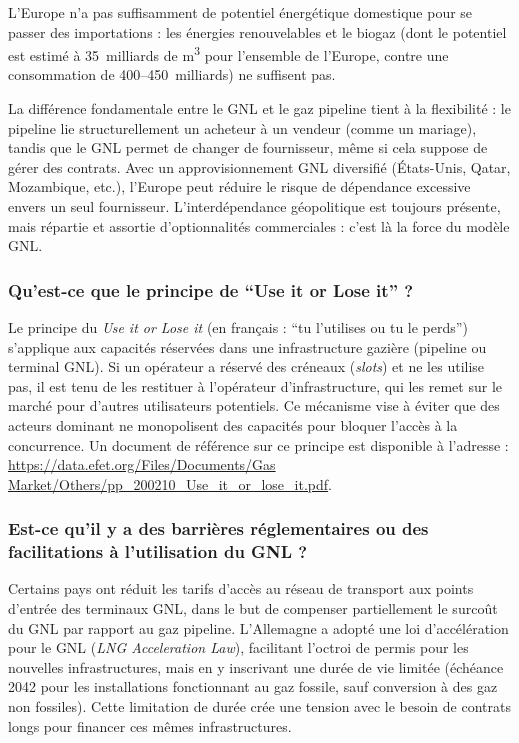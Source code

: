 L'Europe n'a pas suffisamment de potentiel énergétique domestique pour se passer des importations : les énergies renouvelables et le biogaz (dont le potentiel est estimé à 35~milliards de m\textsuperscript{3} pour l'ensemble de l'Europe, contre une consommation de 400--450~milliards) ne suffisent pas.

La différence fondamentale entre le GNL et le gaz pipeline tient à la flexibilité : le pipeline lie structurellement un acheteur à un vendeur (comme un mariage), tandis que le GNL permet de changer de fournisseur, même si cela suppose de gérer des contrats. Avec un approvisionnement GNL diversifié (États-Unis, Qatar, Mozambique, etc.), l'Europe peut réduire le risque de dépendance excessive envers un seul fournisseur. L'interdépendance géopolitique est toujours présente, mais répartie et assortie d'optionnalités commerciales : c'est là la force du modèle GNL.

\subsubsection{Qu'est-ce que le principe de \enquote{Use it or Lose it} ?}

Le principe du \textit{Use it or Lose it} (en français : \enquote{tu l'utilises ou tu le perds}) s'applique aux capacités réservées dans une infrastructure gazière (pipeline ou terminal GNL). Si un opérateur a réservé des créneaux (\textit{slots}) et ne les utilise pas, il est tenu de les restituer à l'opérateur d'infrastructure, qui les remet sur le marché pour d'autres utilisateurs potentiels. Ce mécanisme vise à éviter que des acteurs dominant ne monopolisent des capacités pour bloquer l'accès à la concurrence. Un document de référence sur ce principe est disponible à l'adresse : \url{https://data.efet.org/Files/Documents/Gas Market/Others/pp_200210_Use_it_or_lose_it.pdf}.

\subsubsection{Est-ce qu'il y a des barrières réglementaires ou des facilitations à l'utilisation du GNL ?}

Certains pays ont réduit les tarifs d'accès au réseau de transport aux points d'entrée des terminaux GNL, dans le but de compenser partiellement le surcoût du GNL par rapport au gaz pipeline. L'Allemagne a adopté une loi d'accélération pour le GNL (\textit{LNG Acceleration Law}), facilitant l'octroi de permis pour les nouvelles infrastructures, mais en y inscrivant une durée de vie limitée (échéance 2042 pour les installations fonctionnant au gaz fossile, sauf conversion à des gaz non fossiles). Cette limitation de durée crée une tension avec le besoin de contrats longs pour financer ces mêmes infrastructures.

